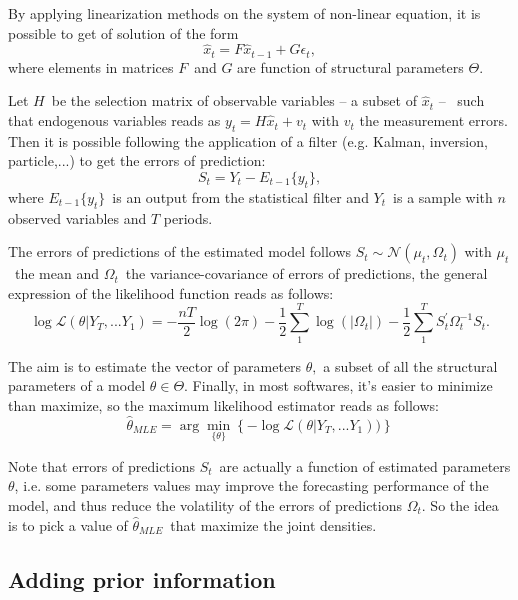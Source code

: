 \documentclass[a4paper,12pt]{article}%
\begin{document}
By applying linearization methods on the system of non-linear equation, it is
possible to get of solution of the form
\begin{equation}
\hat{x}_{t}=F\hat{x}_{t-1}+G\epsilon_{t}, \label{eq: non linear DR}%
\end{equation}
where elements in matrices $F$\ and $G$ are function of structural parameters
$\Theta$.

Let $H$\ be the selection matrix of observable variables -- a subset of
$\hat{x}_{t}$ -- \ such that endogenous variables reads as $y_{t}=H\hat{x}%
_{t}+v_{t}$ with $v_{t}$ the measurement errors. Then it is possible following
the application of a filter (e.g. Kalman, inversion, particle,...) to get the
errors of prediction:%
\[
S_{t}=Y_{t}-E_{t-1}\{y_{t}\},
\]
where $E_{t-1}\{y_{t}\}$\ is an output from the statistical filter and $Y_{t}%
$\ is a sample with $n$ observed variables and $T$ periods.\ 

The errors of predictions of the estimated model follows $S_{t}\sim
\mathcal{N}(\mu_{t},\Omega_{t})$ with $\mu_{t}$\ the mean and $\Omega_{t}%
$\ the variance-covariance of errors of predictions, the general expression of
the likelihood function reads as follows:%
\begin{equation}
\log\mathcal{L}\left(  \theta|Y_{T},...Y_{1}\right)  =-\frac{nT}{2}\log
(2\pi)-\frac{1}{2}\sum_{1}^{T}\log\left(  |\Omega_{t}|\right)  -\frac{1}%
{2}\sum_{1}^{T}S_{t}^{\prime}\Omega_{t}^{-1}S_{t}.
\end{equation}


The aim is to estimate the vector of parameters $\theta,$ a subset of all the
structural parameters of a model $\theta\in\Theta$. Finally, in most
softwares, it's easier to minimize than maximize, so the maximum likelihood
estimator reads as follows:%
\begin{equation}
\hat{\theta}_{MLE}=\arg\min_{\{\theta\}}\left\{  -\log\mathcal{L}\left(
\theta|Y_{T},...Y_{1}\right)  )\right\}
\end{equation}


Note that errors of predictions $S_{t}$\ are actually a function of estimated
parameters $\theta$, i.e. some parameters values may improve the forecasting
performance of the model, and thus reduce the volatility of the errors of
predictions $\Omega_{t}$. So the idea is to pick a value of $\hat{\theta
}_{MLE}$\ that maximize the joint densities.

\subsection{Adding prior information}
\end{document}
